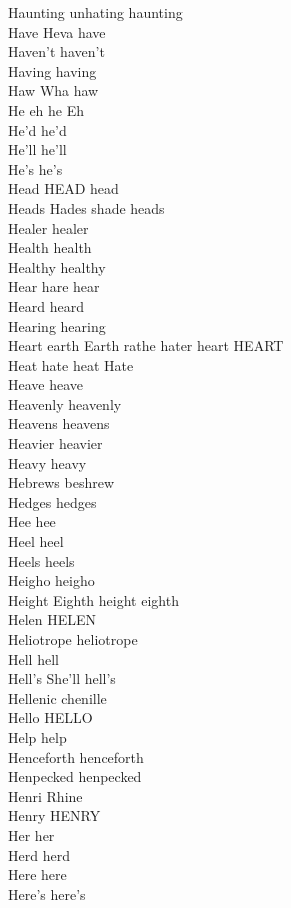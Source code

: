 Haunting unhating haunting\\
Have Heva have\\
Haven't haven't\\
Having having\\
Haw Wha haw\\
He eh he Eh\\
He'd he'd\\
He'll he'll\\
He's he's\\
Head HEAD head\\
Heads Hades shade heads\\
Healer healer\\
Health health\\
Healthy healthy\\
Hear hare hear\\
Heard heard\\
Hearing hearing\\
Heart earth Earth rathe hater heart HEART\\
Heat hate heat Hate\\
Heave heave\\
Heavenly heavenly\\
Heavens heavens\\
Heavier heavier\\
Heavy heavy\\
Hebrews beshrew\\
Hedges hedges\\
Hee hee\\
Heel heel\\
Heels heels\\
Heigho heigho\\
Height Eighth height eighth\\
Helen HELEN\\
Heliotrope heliotrope\\
Hell hell\\
Hell's She'll hell's\\
Hellenic chenille\\
Hello HELLO\\
Help help\\
Henceforth henceforth\\
Henpecked henpecked\\
Henri Rhine\\
Henry HENRY\\
Her her\\
Herd herd\\
Here here\\
Here's here's\\
